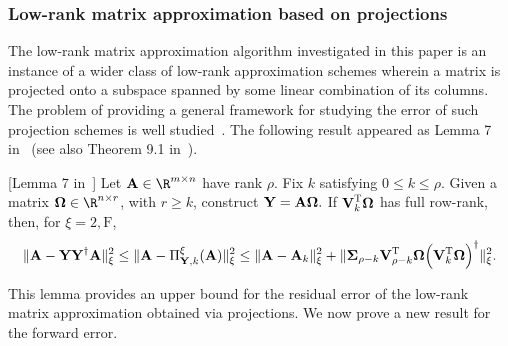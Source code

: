 \subsubsection{Low-rank matrix approximation based on projections}\label{sec:presth}

The low-rank matrix approximation algorithm investigated in this paper is an instance of a wider class of low-rank approximation schemes wherein a matrix is projected onto a subspace spanned by some linear combination of its columns. The problem of providing a general framework for studying the error of such projection schemes is well studied~\cite{BMD09a,HMT,BDM11a}. The following result appeared as Lemma 7 in~\cite{BMD09a} (see also Theorem 9.1 in~\cite{HMT}).
\begin{lemma}
\label{prop:structural-result}[Lemma 7 in~\cite{BMD09a}]
Let $\matA \in \R^{m \times n}$ have rank $\rho.$ Fix $k$ satisfying $0 \leq k \leq \rho$.
Given a matrix $\matOmega \in \R^{n \times r}$, with $r \ge k$, construct ${\bm{\mathrm{Y}}} = {\bm{\mathrm{A}}} {\bm{\mathrm{\Omega}}}.$ If ${\bm{\mathrm{V}}}_k ^{\textsc{T}} {\bm{\mathrm{\Omega}}}$ has full row-rank, then,
for $\xi=2, \mathrm{F}$,
\begin{equation}
\label{eqn:tropp-structural-result}
\XNormS{\matA - \matY \pinv{\matY} \matA}
\leq
\XNormS{\matA -  \Pi_{\matY,k}^{\xi}(\matA) }
\leq
\XNormS{ \matA - \matA_k } + \XNormS{\matSig_{\rho - k} \matV_{\rho-k} \transp \matOmega \pinv{\left( \matV_k \transp \matOmega \right)} }.
\end{equation}
\end{lemma}
This lemma provides an upper bound for the residual error of the low-rank matrix approximation obtained via projections.
We now prove a new result for the forward error.

